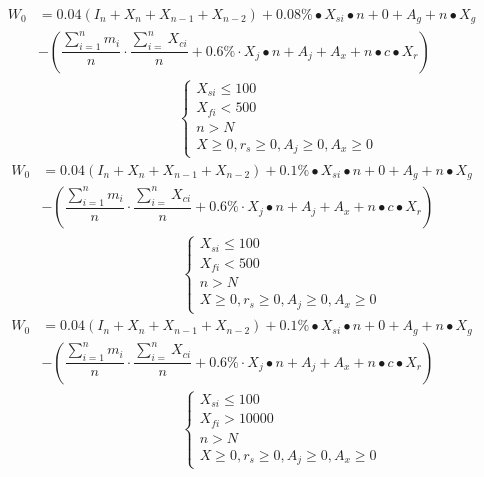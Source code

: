 \documentclass[../mcmpaper]{subfiles}
\begin{document}
\begin{equation}
\begin{aligned}
W_{0}&=0.04\left(I_{n}+X_{n}+X_{n-1}+X_{n-2}\right)+0.08 \% \bullet X_{s i} \bullet n+0+A_{g}+n \bullet X_{g} \\
&-\left(\dfrac{\sum_{i=1}^{n} m_{i}}{n} \cdot \dfrac{\sum_{i=}^{n} X_{c i}}{n}+0.6 \% \cdot X_{j} \bullet n+A_{j}+A_{x}+n \bullet c \bullet X_{r}\right) \\
&\hspace{10em}\left\{\begin{array}{l}
X_{s i} \leq 100 \\
X_{f i}<500 \\
n>N \\
X \geq 0, r_{s} \geq 0, A_{j} \geq 0, A_{x} \geq 0
\end{array}\right.
\end{aligned}
\end{equation}
\begin{equation}
\begin{aligned}
W_{0}&=0.04\left(I_{n}+X_{n}+X_{n-1}+X_{n-2}\right)+0.1 \% \bullet X_{s i} \bullet n+0+A_{g}+n \bullet X_{g} \\
&-\left(\dfrac{\sum_{i=1}^{n} m_{i}}{n} \cdot \dfrac{\sum_{i=}^{n} X_{c i}}{n}+0.6\% \cdot X_{j} \bullet n+A_{j}+A_{x}+n \bullet c \bullet X_{r}\right) \\
&\hspace{10em}\left\{\begin{array}{l}
X_{s i} \leq 100 \\
X_{f i}<500 \\
n>N \\
X \geq 0, r_{s} \geq 0, A_{j} \geq 0, A_{x} \geq 0
\end{array}\right.
\end{aligned}
\end{equation}
\begin{equation}
\begin{aligned}
W_{0}&=0.04\left(I_{n}+X_{n}+X_{n-1}+X_{n-2}\right)+0.1 \% \bullet X_{s i} \bullet n+0+A_{g}+n \bullet X_{g} \\
&-\left(\dfrac{\sum_{i=1}^{n} m_{i}}{n} \cdot \dfrac{\sum_{i=}^{n} X_{c i}}{n}+0.6\% \cdot X_{j} \bullet n+A_{j}+A_{x}+n \bullet c \bullet X_{r}\right) \\
&\hspace{10em}\left\{\begin{array}{l}
X_{s i} \leq 100 \\
X_{f i}>10000 \\
n>N \\
X \geq 0, r_{s} \geq 0, A_{j} \geq 0, A_{x} \geq 0
\end{array}\right.
\end{aligned}
\end{equation}
\end{document}
